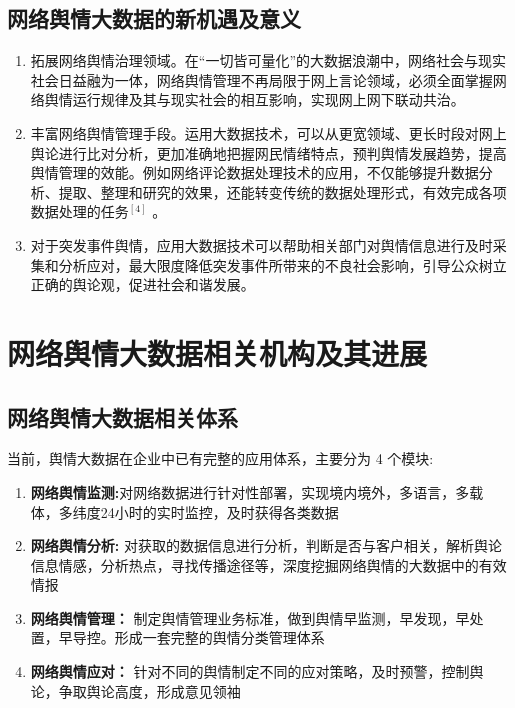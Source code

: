 \documentclass[11pt,a4paper,utf8]{article}
\begin{document}
\subsection{网络舆情大数据的新机遇及意义}


\begin{enumerate}
\item 拓展网络舆情治理领域。在“一切皆可量化”的大数据浪潮中，网络社会与现实社会日益融为一体，网络舆情管理不再局限于网上言论领域，必须全面掌握网络舆情运行规律及其与现实社会的相互影响，实现网上网下联动共治。 

\item 丰富网络舆情管理手段。运用大数据技术，可以从更宽领域、更长时段对网上舆论进行比对分析，更加准确地把握网民情绪特点，预判舆情发展趋势，提高舆情管理的效能。例如网络评论数据处理技术的应用，不仅能够提升数据分析、提取、整理和研究的效果，还能转变传统的数据处理形式，有效完成各项数据处理的任务$^{[4]}$ 。 

\item 对于突发事件舆情，应用大数据技术可以帮助相关部门对舆情信息进行及时采集和分析应对，最大限度降低突发事件所带来的不良社会影响，引导公众树立正确的舆论观，促进社会和谐发展。 

\end{enumerate}
  

\section{网络舆情大数据相关机构及其进展}

{\color{red}{以下部分由夏睿书写整理}} 

\subsection{网络舆情大数据相关体系}
当前，舆情大数据在企业中已有完整的应用体系，主要分为 4 个模块:
\begin{enumerate}
\item \textbf{网络舆情监测:}对网络数据进行针对性部署，实现境内境外，多语言，多载体，多纬度24小时的实时监控，及时获得各类数据
\item \textbf{网络舆情分析:} 对获取的数据信息进行分析，判断是否与客户相关，解析舆论信息情感，分析热点，寻找传播途径等，深度挖掘网络舆情的大数据中的有效情报
\item \textbf{网络舆情管理：} 制定舆情管理业务标准，做到舆情早监测，早发现，早处置，早导控。形成一套完整的舆情分类管理体系
\item \textbf{网络舆情应对：} 针对不同的舆情制定不同的应对策略，及时预警，控制舆论，争取舆论高度，形成意见领袖 
\end{enumerate}
\end{document}
